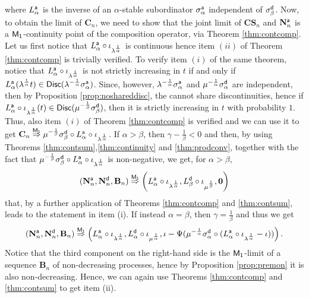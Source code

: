 \documentclass[]{amsart}
\numberwithin{equation}{section}
\theoremstyle{remark}
\theoremstyle{definition}
\begin{document}
	where $L_\alpha^{\sf a}$ is the inverse of an $\alpha$-stable subordinator $\sigma_\alpha^{\sf a}$ independent of $\sigma_\beta^{\sf d}$. Now, to obtain the limit of $\mathbf{C}_n$, we need to show that the joint limit of $\mathbf{CS}_n$ and $\mathbf{N}_n^{\sf a}$ is a ${\sf M_1}$-continuity point of the composition operator, via Theorem \ref{thm:contcomp}. Let us first notice that $L_{\alpha}^{\sf a}\circ \iota_{\lambda^{\frac{1}{\alpha}}}$ is continuous hence item $(ii)$ of Theorem \ref{thm:contcomp} is trivially verified. To verify item $(i)$ of the same theorem, notice that $L_\alpha^{\sf a} \circ \iota_{\lambda^{\frac{1}{\alpha}}}$ is not strictly increasing in $t$ if and only if $L_\alpha^{\sf a}(\lambda^{\frac{1}{\alpha}}t) \in {\sf Disc}(\lambda^{-\frac{1}{\alpha}}\sigma_\alpha^{\sf a})$. Since, however, $\lambda^{-\frac{1}{\alpha}}\sigma_\alpha^{\sf a}$ and $\mu^{-\frac{1}{\alpha}}\sigma_\alpha^{\sf d}$ are independent, then by Proposition \ref{prop:noshareddisc}, the cannot share discontinuities, hence if $L_\alpha^{\sf a} \circ \iota_{\lambda^{\frac{1}{\alpha}}}(t) \in {\sf Disc}(\mu^{-\frac{1}{\beta}}\sigma_\beta^{\sf d})$, then it is strictly increasing in $t$ with probability $1$. Thus, also item $(i)$ of Theorem \ref{thm:contcomp} is verified and we can use it to get $\mathbf{C}_n \overset{\sf M_1}{\Rightarrow} \mu^{-\frac{1}{\beta}}\sigma_\beta^{\sf d} \circ L_\alpha^{\sf a} \circ \iota_{\lambda^{\frac{1}{\alpha}}}$. If $\alpha>\beta$, then $\gamma-\frac{1}{\beta}<0$ and then, by using Theorems \ref{thm:contsum},\ref{thm:continuity} and \ref{thm:prodconv}, together with the fact that $\mu^{-\frac{1}{\beta}}\sigma_\beta^{\sf d} \circ L_\alpha^{\sf a} \circ \iota_{\lambda^{\frac{1}{\alpha}}}$ is non-negative, we get, for $\alpha>\beta$,
	\begin{equation*}
		(\mathbf{N}^{\sf a}_n,\mathbf{N}^{\sf d}_n,\mathbf{B}_n) \overset{\sf M_1}{\Rightarrow} \left(L_\alpha^{\sf a}\circ \iota_{\lambda^{\frac{1}{\alpha}}},L_\beta^{\sf d}\circ \iota_{\mu^{\frac{1}{\beta}}},\mathbf{0}\right)
	\end{equation*}
	that, by a further application of Theorems \ref{thm:contcomp} and \ref{thm:contsum}, leads to the statement in item (i). If instead $\alpha=\beta$, then $\gamma=\frac{1}{\beta}$ and thus we get
	\begin{equation*}
		(\mathbf{N}^{\sf a}_n,\mathbf{N}^{\sf d}_n,\mathbf{B}_n) \overset{\sf M_1}{\Rightarrow}\left(L_\alpha^{\sf a}\circ \iota_{\lambda^{\frac{1}{\alpha}}},L_\alpha^{\sf d}\circ \iota_{\mu^{\frac{1}{\alpha}}},\iota-\Psi(\mu^{-\frac{1}{\alpha}}\sigma_\alpha^{\sf d}\circ (L_\alpha^{\sf a} \circ \iota_{\lambda^{\frac{1}{\alpha}}}-\iota))\right).
	\end{equation*}
	Notice that the third component on the right-hand side is the ${\sf M_1}$-limit of a sequence $\mathbf{B}_n$ of non-decreasing processes, hence by Proposition \ref{prop:premon} it is also non-decreasing. Hence, we can again use Theorems \ref{thm:contcomp} and \ref{thm:contsum} to get item (ii).
	
\end{document}
